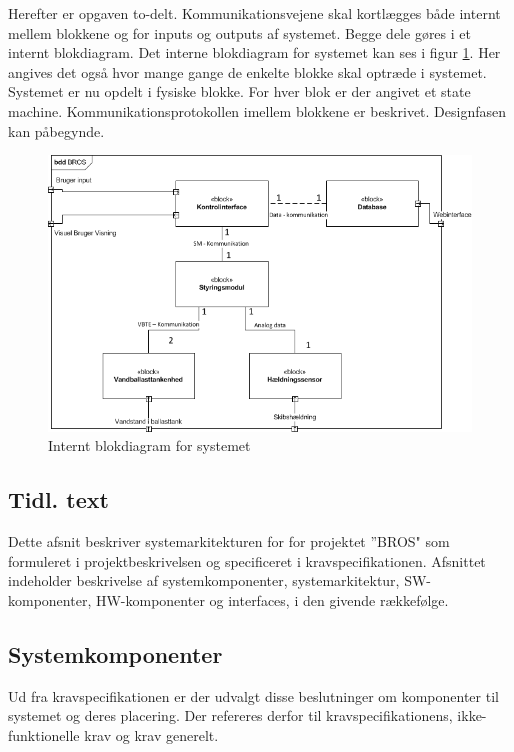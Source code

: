 Herefter er opgaven to-delt. Kommunikationsvejene skal kortlægges både internt mellem blokkene og for inputs og outputs af systemet. Begge dele gøres i et internt blokdiagram. Det interne blokdiagram for systemet kan ses i figur \ref{fig:idb_bros}. Her angives det også hvor mange gange de enkelte blokke skal optræde i systemet.\\

Systemet er nu opdelt i fysiske blokke. For hver blok er der angivet et state machine. Kommunikationsprotokollen imellem blokkene er beskrivet. Designfasen kan påbegynde.

\begin{figure}[htbp]
\centering
\includegraphics[scale=0.8]{billeder/Systemarkitektur/ibd_bros}
\caption{Internt blokdiagram for systemet}
\label{fig:idb_bros}
\end{figure}

\subsection{Tidl. text}
Dette afsnit beskriver systemarkitekturen for for projektet ”BROS" som formuleret i projektbeskrivelsen og specificeret i kravspecifikationen.
Afsnittet indeholder beskrivelse af systemkomponenter, systemarkitektur, SW-komponenter, HW-komponenter og interfaces, i den givende rækkefølge.

\subsection{Systemkomponenter}
Ud fra kravspecifikationen er der udvalgt disse beslutninger om komponenter til systemet og deres placering. Der refereres derfor til kravspecifikationens, ikke-funktionelle krav og krav generelt.

